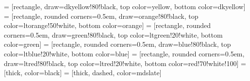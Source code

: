\usetikzlibrary{arrows,shapes}

 = [rectangle, 
                      draw=dkyellow!80!black,
                      top color=yellow,
                      bottom color=dkyellow]
 = [rectangle, 
                      rounded corners=0.5em,
                      draw=orange!80!black,
                      top color=ltorange!50!white,
                      bottom color=orange]
 = [rectangle, 
                      rounded corners=0.5em,
                      draw=green!80!black,
                      top color=ltgreen!20!white,
                      bottom color=green]
 = [rectangle, 
                      rounded corners=0.5em,
                      draw=blue!80!black,
                      top color=ltblue!20!white,
                      bottom color=blue]
 = [rectangle, 
                      rounded corners=0.5em,
                      draw=ltred!80!black,
                      top color=ltred!20!white,
                      bottom color=red!70!white!100]
 = [thick, color=black]
 = [thick, dashed, color=mdslate]


